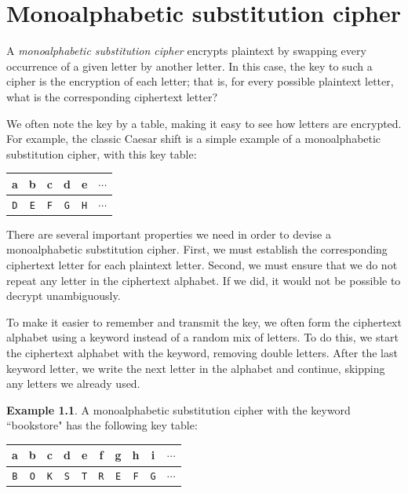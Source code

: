 \documentclass{book}
\theoremstyle{plain}
\theoremstyle{definition}
\newtheorem{example}[theorem]{Example}
\newcommand{\ciphertext}[1]{\texttt{#1}} %
\begin{document}
\chapter{Monoalphabetic substitution cipher}
A {\it monoalphabetic substitution cipher} encrypts plaintext by swapping every occurrence of a given letter by another letter. In this case, the key to such a cipher is the encryption of each letter; that is, for every possible plaintext letter, what is the corresponding ciphertext letter?

We often note the key by a table, making it easy to see how letters are encrypted. For example, the classic Caesar shift is a simple example of a monoalphabetic substitution cipher, with this key table:

\begin{center}
\begin{tabular}{cccccc}
a & b & c & d & e & $\cdots$ \\
\hline
\ciphertext{D} & \ciphertext{E} & \ciphertext{F} & \ciphertext{G} & \ciphertext{H} & $\cdots$
\end{tabular}
\end{center}

There are several important properties we need in order to devise a monoalphabetic substitution cipher. First, we must establish the corresponding ciphertext letter for each plaintext letter. Second, we must ensure that we do not repeat any letter in the ciphertext alphabet. If we did, it would not be possible to decrypt unambiguously.

To make it easier to remember and transmit the key, we often form the ciphertext alphabet using a keyword instead of a random mix of letters. To do this, we start the ciphertext alphabet with the keyword, removing double letters. After the last keyword letter, we write the next letter in the alphabet and continue, skipping any letters we already used.

\begin{example}
A monoalphabetic substitution cipher with the keyword ``bookstore" has the following key table:

\begin{center}
\begin{tabular}{cccccccccc}
a & b & c & d & e & f & g & h & i & $\cdots$ \\
\hline
\ciphertext{B} & \ciphertext{O} & \ciphertext{K} & \ciphertext{S} & \ciphertext{T} & \ciphertext{R} & \ciphertext{E} & \ciphertext{F} & \ciphertext{G} & $\cdots$
\end{tabular}
\end{center}
\end{example}
\end{document}
